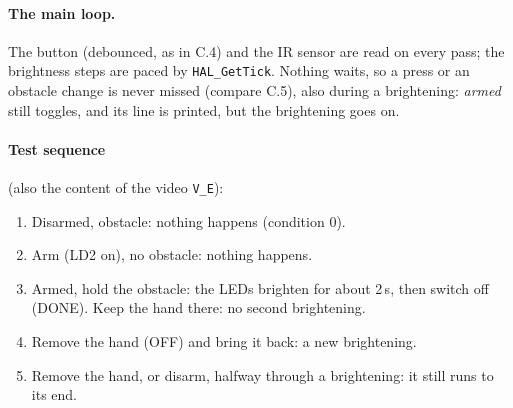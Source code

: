 \documentclass[11pt,a4paper]{article}
\begin{document}
\paragraph{The main loop.} The button (debounced, as in C.4) and the IR sensor are read on every pass; the brightness
steps are paced by \texttt{HAL\_GetTick}. Nothing waits, so a press or an obstacle change is never missed (compare C.5),
also during a brightening: \emph{armed} still toggles, and its line is printed, but the brightening goes on.

\paragraph{Test sequence} (also the content of the video \texttt{V\_E}):
\begin{enumerate}
  \item Disarmed, obstacle: nothing happens (condition 0).
  \item Arm (LD2 on), no obstacle: nothing happens.
  \item Armed, hold the obstacle: the LEDs brighten for about 2\,s, then switch off (DONE). Keep the hand there: no
        second brightening.
  \item Remove the hand (OFF) and bring it back: a new brightening.
  \item Remove the hand, or disarm, halfway through a brightening: it still runs to its end.
\end{enumerate}
\end{document}

